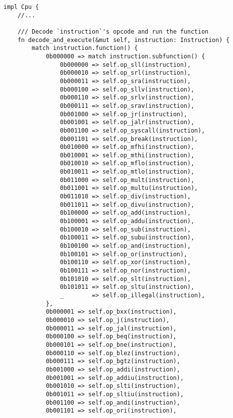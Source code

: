 \documentclass[a4paper]{article}
\begin{document}
\begin{lstlisting}
impl Cpu {
    //...

    /// Decode `instruction`'s opcode and run the function
    fn decode_and_execute(&mut self, instruction: Instruction) {
        match instruction.function() {
            0b000000 => match instruction.subfunction() {
                0b000000 => self.op_sll(instruction),
                0b000010 => self.op_srl(instruction),
                0b000011 => self.op_sra(instruction),
                0b000100 => self.op_sllv(instruction),
                0b000110 => self.op_srlv(instruction),
                0b000111 => self.op_srav(instruction),
                0b001000 => self.op_jr(instruction),
                0b001001 => self.op_jalr(instruction),
                0b001100 => self.op_syscall(instruction),
                0b001101 => self.op_break(instruction),
                0b010000 => self.op_mfhi(instruction),
                0b010001 => self.op_mthi(instruction),
                0b010010 => self.op_mflo(instruction),
                0b010011 => self.op_mtlo(instruction),
                0b011000 => self.op_mult(instruction),
                0b011001 => self.op_multu(instruction),
                0b011010 => self.op_div(instruction),
                0b011011 => self.op_divu(instruction),
                0b100000 => self.op_add(instruction),
                0b100001 => self.op_addu(instruction),
                0b100010 => self.op_sub(instruction),
                0b100011 => self.op_subu(instruction),
                0b100100 => self.op_and(instruction),
                0b100101 => self.op_or(instruction),
                0b100110 => self.op_xor(instruction),
                0b100111 => self.op_nor(instruction),
                0b101010 => self.op_slt(instruction),
                0b101011 => self.op_sltu(instruction),
                _        => self.op_illegal(instruction),
            },
            0b000001 => self.op_bxx(instruction),
            0b000010 => self.op_j(instruction),
            0b000011 => self.op_jal(instruction),
            0b000100 => self.op_beq(instruction),
            0b000101 => self.op_bne(instruction),
            0b000110 => self.op_blez(instruction),
            0b000111 => self.op_bgtz(instruction),
            0b001000 => self.op_addi(instruction),
            0b001001 => self.op_addiu(instruction),
            0b001010 => self.op_slti(instruction),
            0b001011 => self.op_sltiu(instruction),
            0b001100 => self.op_andi(instruction),
            0b001101 => self.op_ori(instruction),

\end{lstlisting}
\end{document}
